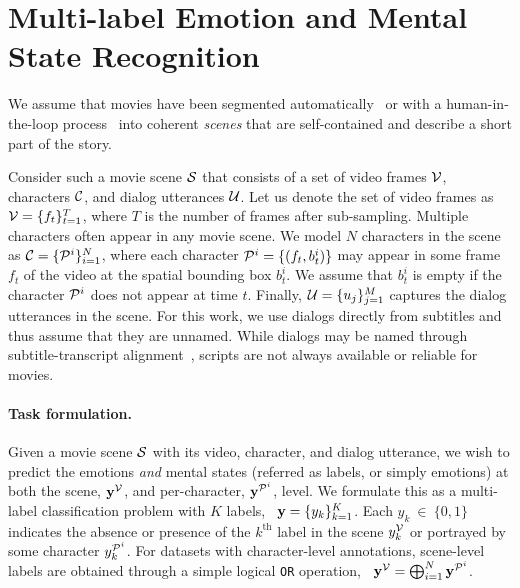 \section{Multi-label Emotion and Mental State Recognition}
\label{subsec:ps}

We assume that movies have been segmented automatically~\cite{local2global_sceneseg} or with a human-in-the-loop process~\cite{tapaswi2014storygraphs, moviegraphs} into coherent \emph{scenes} that are self-contained and describe a short part of the story.

Consider such a movie scene $\mathcal{S}$ that consists of a set of video frames $\mathcal{V}$, characters $\mathcal{C}$, and dialog utterances $\mathcal{U}$.
Let us denote the set of video frames as $\mathcal{V} = \{f_t\}_{t=1}^T$, where $T$ is the number of frames after sub-sampling.
Multiple characters often appear in any movie scene.
We model $N$ characters in the scene as $\mathcal{C} = \{\mathcal{P}^i\}_{i=1}^{N}$, where each character $\mathcal{P}^i = \{(f_t, b_t^i)\}$ may appear in some frame $f_t$ of the video at the spatial bounding box $b_t^i$.
We assume that $b_t^i$ is empty if the character $\mathcal{P}^i$ does not appear at time $t$.
Finally, $\mathcal{U} = \{u_j\}_{j=1}^{M}$ captures the dialog utterances in the scene.
For this work, we use dialogs directly from subtitles and thus assume that they are unnamed.
While dialogs may be named through subtitle-transcript alignment~\cite{buffy}, scripts are not always available or reliable for movies.

\paragraph{Task formulation.}
Given a movie scene $\mathcal{S}$ with its video, character, and dialog utterance,
we wish to predict the emotions \emph{and} mental states (referred as labels, or simply emotions) at both the scene, $\mathbf{y}^{\mathcal{V}}$,
and per-character, $\mathbf{y}^{\mathcal{P}^i}$, level.
We formulate this as a multi-label classification problem with $K$ labels, \ie~$\mathbf{y} = \{y_k\}_{k=1}^K$.
Each $y_k\ {\in}\ \{0, 1\}$ indicates the absence or presence of the $k^\text{th}$ label in the scene $y_k^{\mathcal{V}}$ or portrayed by some character $y_k^{\mathcal{P}^i}$.
For datasets with character-level annotations, scene-level labels are obtained through a simple logical \texttt{OR} operation, \ie~$\mathbf{y}^{\mathcal{V}} = \bigoplus_{i=1}^{N}\mathbf{y}^{\mathcal{P}^i}$.

